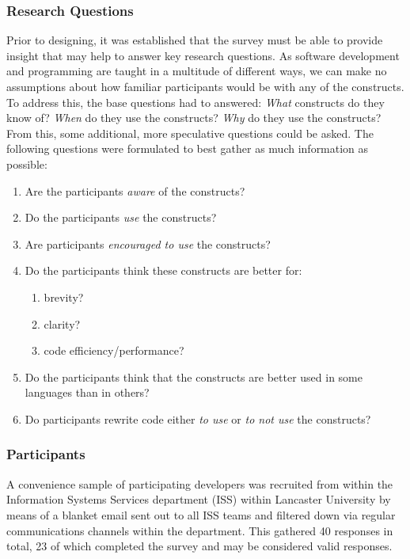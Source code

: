 \documentclass{article}
\begin{document}
        \subsubsection{Research Questions}
        \label{subsubsec:surveyQuestions}
            Prior to designing, it was established that the survey must be able to provide insight that may help to answer key research questions. As software development and programming are taught in a multitude of different ways, we can make no assumptions about how familiar participants would be with any of the constructs. To address this, the base questions had to answered: \emph{What} constructs do they know of? \emph{When} do they use the constructs? \emph{Why} do they use the constructs? From this, some additional, more speculative questions could be asked. The following questions were formulated to best gather as much information as possible:
            \begin{enumerate}
                \item Are the participants \emph{aware} of the constructs?
                \item Do the participants \emph{use} the constructs?
                \item Are participants \emph{encouraged to use} the constructs?
                \item Do the participants think these constructs are better for:
                \begin{enumerate}
                    \item brevity?
                    \item clarity?
                    \item code efficiency/performance?
                \end{enumerate}  
                \item Do the participants think that the constructs are better used in some languages than in others?
                \item Do participants rewrite code either \emph{to use} or \emph{to not use} the constructs?
            \end{enumerate}
            
        \subsubsection{Participants}
            A convenience sample of participating developers was recruited from within the Information Systems Services department (ISS) within Lancaster University by means of a blanket email sent out to all ISS teams and filtered down via regular communications channels within the department. This gathered 40 responses in total, 23 of which completed the survey and may be considered valid responses.
            
\end{document}

